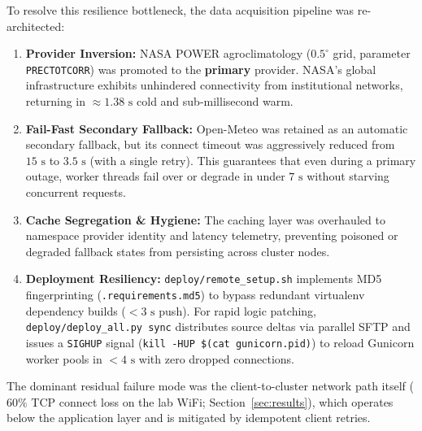 \documentclass[manuscript,screen,review]{acmart}
\begin{document}
To resolve this resilience bottleneck, the data acquisition pipeline was re-architected:
\begin{enumerate}
    \item \textbf{Provider Inversion:} NASA POWER agroclimatology ($0.5^\circ$ grid, parameter \texttt{PRECTOTCORR}) was promoted to the \textbf{primary} provider. NASA's global infrastructure exhibits unhindered connectivity from institutional networks, returning in $\approx 1.38\text{ s}$ cold and sub-millisecond warm.
    \item \textbf{Fail-Fast Secondary Fallback:} Open-Meteo was retained as an automatic secondary fallback, but its connect timeout was aggressively reduced from $15\text{ s}$ to $3.5\text{ s}$ (with a single retry). This guarantees that even during a primary outage, worker threads fail over or degrade in under $7\text{ s}$ without starving concurrent requests.
    \item \textbf{Cache Segregation \& Hygiene:} The caching layer was overhauled to namespace provider identity and latency telemetry, preventing poisoned or degraded fallback states from persisting across cluster nodes.
    \item \textbf{Deployment Resiliency:} \texttt{deploy/remote\_setup.sh} implements MD5 fingerprinting (\texttt{.requirements.md5}) to bypass redundant virtualenv dependency builds ($<3\text{ s}$ push). For rapid logic patching, \texttt{deploy/deploy\_all.py sync} distributes source deltas via parallel SFTP and issues a \texttt{SIGHUP} signal (\texttt{kill -HUP \$(cat gunicorn.pid)}) to reload Gunicorn worker pools in $<4\text{ s}$ with zero dropped connections.
\end{enumerate}

The dominant residual failure mode was the client-to-cluster network path itself ($60\%$ TCP connect loss on the lab WiFi; Section~\ref{sec:results}), which operates below the application layer and is mitigated by idempotent client retries.
\end{document}
